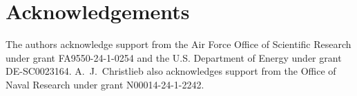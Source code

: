 \documentclass{article}
\theoremstyle{plain}
\theoremstyle{definition}
\theoremstyle{remark}
\begin{document}
\section*{Acknowledgements}

The authors acknowledge support from the Air Force Office of Scientific Research under grant FA9550-24-1-0254 and the U.S. Department of Energy under grant DE-SC0023164. A.~J.~Christlieb also acknowledges support from the Office of Naval Research under grant N00014-24-1-2242.



 

\end{document}
